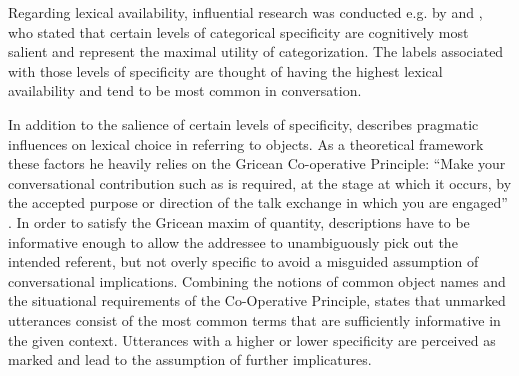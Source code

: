 \documentclass[11pt,a4paper]{article}
\begin{document}
Regarding lexical availability, influential research was conducted e.g. by \citet{Rosch1976} and \citet{Jolicoeur1984}, who stated that certain levels of categorical specificity are cognitively most salient and represent the maximal utility of categorization. The labels associated with those levels of specificity are thought of having the highest lexical availability and tend to be most common in conversation.

In addition to the salience of certain levels of specificity, \citet{Cruse1977} describes pragmatic influences on lexical choice in referring to objects. As a theoretical framework these factors he heavily relies on the Gricean Co-operative Principle: \enquote{Make your conversational contribution such as is required, at the stage at which it occurs, by the accepted purpose or direction of the talk exchange in which you are engaged} \citep[45]{Grice1975}. 
In order to satisfy the Gricean maxim of quantity, descriptions have to be informative enough to allow the addressee to unambiguously pick out the intended referent, but not overly specific to avoid a misguided assumption of conversational implications. Combining the notions of common object names and the situational requirements of the Co-Operative Principle, \citet{Cruse1977} states that unmarked utterances consist of the most common terms that are sufficiently informative in the given context. Utterances with a higher or lower specificity are perceived as marked and lead to the assumption of further implicatures.
\end{document}
